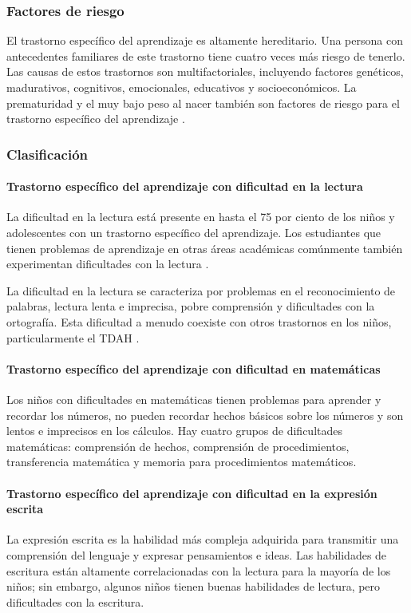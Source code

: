 \subsubsection{Factores de riesgo}
El trastorno específico del aprendizaje es altamente hereditario. Una persona
con antecedentes familiares de este trastorno tiene cuatro veces más riesgo de
tenerlo. Las causas de estos trastornos son multifactoriales, incluyendo
factores genéticos, madurativos, cognitivos, emocionales, educativos y
socioeconómicos. La prematuridad y el muy bajo peso al nacer también son
factores de riesgo para el trastorno específico del aprendizaje
\cite{Frierson2025, Boland2021-by}.

\subsubsection{Clasificación}
\paragraph{Trastorno específico del aprendizaje con dificultad en la lectura}
La dificultad en la lectura está presente en hasta el 75 por ciento de los
niños y adolescentes con un trastorno específico del aprendizaje. Los
estudiantes que tienen problemas de aprendizaje en otras áreas académicas
comúnmente también experimentan dificultades con la lectura
\cite{Boland2021-by}.

La dificultad en la lectura se caracteriza por problemas en el reconocimiento
de palabras, lectura lenta e imprecisa, pobre comprensión y dificultades con
la ortografía. Esta dificultad a menudo coexiste con otros trastornos en los
niños, particularmente el TDAH \cite{Boland2021-by}.

\paragraph{Trastorno específico del aprendizaje con dificultad en matemáticas}
Los niños con dificultades en matemáticas tienen problemas para aprender y
recordar los números, no pueden recordar hechos básicos sobre los números y son
lentos e imprecisos en los cálculos. Hay cuatro grupos de dificultades
matemáticas: comprensión de hechos, comprensión de procedimientos,
transferencia matemática y memoria para procedimientos matemáticos.

\paragraph{Trastorno específico del aprendizaje con dificultad en la expresión escrita}
La expresión escrita es la habilidad más compleja adquirida para transmitir
una comprensión del lenguaje y expresar pensamientos e ideas. Las habilidades
de escritura están altamente correlacionadas con la lectura para la mayoría de
los niños; sin embargo, algunos niños tienen buenas habilidades de lectura,
pero dificultades con la escritura.

